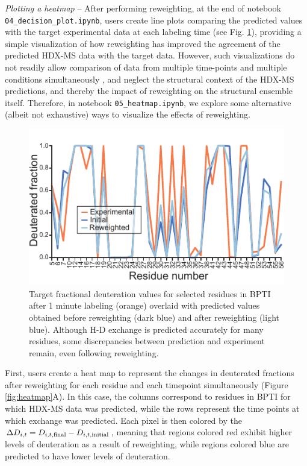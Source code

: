 \documentclass[9pt,tutorial]{livecoms}
\begin{document}
\noindent
\textit{Plotting a heatmap} -- After performing reweighting, at the end of notebook \texttt{04\_decision\_plot.ipynb}, users create line plots comparing the predicted values with the target experimental data at each labeling time (see Fig. \ref{fig:lineplot}), providing a simple visualization of how reweighting has improved the agreement of the predicted HDX-MS data with the target data.
However, such visualizations do not readily allow comparison of data from multiple time-points and multiple conditions simultaneously \cite{Masson2019}, and neglect the structural context of the HDX-MS predictions, and thereby the impact of reweighting on the structural ensemble itself.
Therefore, in notebook \texttt{05\_heatmap.ipynb}, we explore some alternative (albeit not exhaustive) ways to visualize the effects of reweighting.

\begin{figure}
    \includegraphics[width=0.98\linewidth]{Fig5_BPTI_lineplot_1min_v2.pdf}
    \caption{Target fractional deuteration values for selected residues in BPTI after 1 minute labeling (orange) overlaid with predicted values obtained before reweighting (dark blue) and after reweighting (light blue). Although H-D exchange is predicted accurately for many residues, some discrepancies between prediction and experiment remain, even following reweighting.}
    \label{fig:lineplot}
\end{figure}

First, users create a heat map to represent the changes in deuterated fractions after reweighting for each residue and each timepoint simultaneously (Figure \ref{fig:heatmap}A).
In this case, the columns correspond to residues in BPTI for which HDX-MS data was predicted, while the rows represent the time points at which exchange was predicted.
Each pixel is then colored by the $\Delta{D_{i,t}} = D_{i,t,\textnormal{final}} - D_{i,t,\textnormal{initial}}$, meaning that regions colored red exhibit higher levels of deuteration as a result of reweighting, while regions colored blue are predicted to have lower levels of deuteration.
\end{document}
